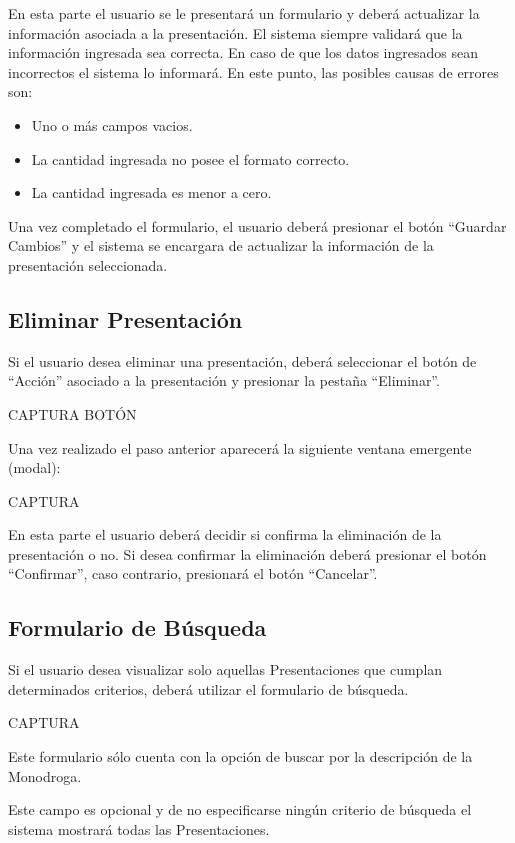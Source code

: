 \documentclass[letterpaper,10pt,spanish]{sphinxmanual}
\begin{document}
En esta parte el usuario se le presentará un formulario y deberá actualizar la información asociada a la presentación.
El sistema siempre validará que la información ingresada sea correcta. En caso de que los datos ingresados sean incorrectos el sistema lo informará.
En este punto, las posibles causas de errores son:
\begin{itemize}
\item {} 
Uno o más campos vacios.

\item {} 
La cantidad ingresada no posee el formato correcto.

\item {} 
La cantidad ingresada es menor a cero.

\end{itemize}

Una vez completado el formulario, el usuario deberá presionar el botón “Guardar Cambios” y el sistema se encargara de actualizar la información de la presentación seleccionada.


\subsection{Eliminar Presentación}
\label{presentaciones:eliminar-presentacion}
Si el usuario desea eliminar una presentación, deberá seleccionar el botón de “Acción” asociado a la presentación y presionar la pestaña “Eliminar”.

CAPTURA BOTÓN

Una vez realizado el paso anterior aparecerá la siguiente ventana emergente (modal):

CAPTURA

En esta parte el usuario deberá decidir si confirma la eliminación de la presentación o no. Si desea confirmar la eliminación deberá presionar el botón “Confirmar”, caso contrario, presionará el botón “Cancelar”.


\subsection{Formulario de Búsqueda}
\label{presentaciones:formulario-de-busqueda}
Si el usuario desea visualizar solo aquellas Presentaciones que cumplan determinados criterios, deberá utilizar el formulario de búsqueda.

CAPTURA

Este formulario sólo cuenta con la opción de buscar por la descripción de la Monodroga.

Este campo es opcional y de no especificarse ningún criterio de búsqueda el sistema mostrará todas las Presentaciones.
\end{document}
